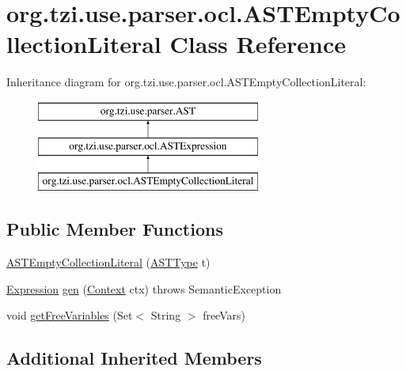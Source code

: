\hypertarget{classorg_1_1tzi_1_1use_1_1parser_1_1ocl_1_1_a_s_t_empty_collection_literal}{\section{org.\-tzi.\-use.\-parser.\-ocl.\-A\-S\-T\-Empty\-Collection\-Literal Class Reference}
\label{classorg_1_1tzi_1_1use_1_1parser_1_1ocl_1_1_a_s_t_empty_collection_literal}
}
Inheritance diagram for org.\-tzi.\-use.\-parser.\-ocl.\-A\-S\-T\-Empty\-Collection\-Literal\-:\begin{figure}[H]
\begin{center}
\leavevmode
\includegraphics[height=3.000000cm]{classorg_1_1tzi_1_1use_1_1parser_1_1ocl_1_1_a_s_t_empty_collection_literal}
\end{center}
\end{figure}
\subsection*{Public Member Functions}
\begin{DoxyCompactItemize}
\item 
\hyperlink{classorg_1_1tzi_1_1use_1_1parser_1_1ocl_1_1_a_s_t_empty_collection_literal_ab3bed6110a920714fc5680791276388d}{A\-S\-T\-Empty\-Collection\-Literal} (\hyperlink{classorg_1_1tzi_1_1use_1_1parser_1_1ocl_1_1_a_s_t_type}{A\-S\-T\-Type} t)
\item 
\hyperlink{classorg_1_1tzi_1_1use_1_1uml_1_1ocl_1_1expr_1_1_expression}{Expression} \hyperlink{classorg_1_1tzi_1_1use_1_1parser_1_1ocl_1_1_a_s_t_empty_collection_literal_af8723371c3639c51ad9011670666e0d4}{gen} (\hyperlink{classorg_1_1tzi_1_1use_1_1parser_1_1_context}{Context} ctx)  throws Semantic\-Exception 
\item 
void \hyperlink{classorg_1_1tzi_1_1use_1_1parser_1_1ocl_1_1_a_s_t_empty_collection_literal_ac58545b5c5ca5e494c25a46c339f1142}{get\-Free\-Variables} (Set$<$ String $>$ free\-Vars)
\end{DoxyCompactItemize}
\subsection*{Additional Inherited Members}


